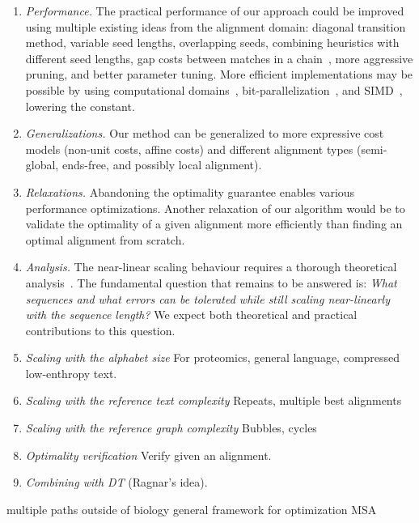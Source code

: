 \begin{enumerate}
    \item \emph{Performance.} The practical performance of our \A approach could
        be improved using multiple existing ideas from the alignment domain:
        diagonal transition method, variable seed lengths, overlapping seeds,
        combining heuristics with different seed lengths, gap costs between
        matches in a chain~\citep{ukkonen1985algorithms,wilbur1984context}, more
        aggressive pruning, and better parameter tuning. More efficient
        implementations may be possible by using computational
        domains~\citep{spouge1989speeding}, bit-parallelization~\citep{myers1999fast},
        and SIMD~\citep{marco2021fast}, lowering the \A constant.
    \item \emph{Generalizations.} Our method can be generalized to more
        expressive cost models (non-unit costs, affine costs) and different alignment
        types (semi-global, ends-free, and possibly local alignment).
    \item \emph{Relaxations.} Abandoning the optimality guarantee
        enables various performance optimizations. Another relaxation
        of our algorithm would be to validate the optimality of a given alignment more
        efficiently than finding an optimal alignment from scratch.
    \item \emph{Analysis.} The near-linear scaling behaviour requires a thorough
        theoretical analysis~\citep{medvedev2022limitations}. The fundamental
        question that remains to be answered is: \emph{What sequences and what
        errors can be tolerated while still scaling near-linearly with the
        sequence length?} We expect both theoretical and practical contributions
        to this question.
    \item \emph{Scaling with the alphabet size} For proteomics, general
        language, compressed low-enthropy text.
    \item \emph{Scaling with the reference text complexity} Repeats, multiple
        best alignments
    \item \emph{Scaling with the reference graph complexity} Bubbles, cycles
    \item \emph{Optimality verification} Verify given an alignment.
    \item \emph{Combining \A with DT} (Ragnar's idea).
\end{enumerate}

multiple paths
outside of biology
general framework for optimization
MSA

